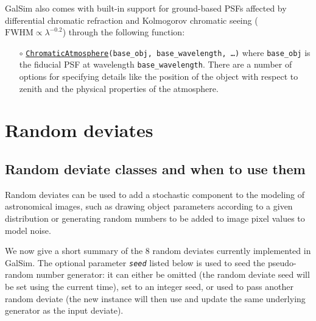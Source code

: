 \documentclass[preprint,10pt]{../../devel/modules/aastex}
\begin{document}
GalSim also comes with built-in support for ground-based PSFs affected by differential chromatic
refraction and Kolmogorov chromatic seeing ($\mathrm{FWHM} \propto \lambda^{-0.2}$) through the
following function:
\begin{itemize}
\item[$\circ$] \texttt{\href{http://galsim-developers.github.io/GalSim/namespacegalsim_1_1chromatic.html\#a90f867f2cde815b9048117e9e426e968}{ChromaticAtmosphere}(base\_obj, base\_wavelength, \dots)}\newline
  where \texttt{base\_obj} is the fiducial PSF at wavelength \texttt{base\_wavelength}.
  There are a number of options for specifying details like the position of the object with
  respect to zenith and the physical properties of the atmosphere.
\end{itemize}

\section{Random deviates}\label{sect:random}
\subsection{Random deviate classes and when to use them}
Random deviates can be used to add a stochastic
component to the modeling of astronomical images, such as drawing
object parameters according to a given distribution or generating random
numbers to be added to image pixel values to model noise.

We now give a short summary of the 8 random deviates currently
implemented in GalSim.   The optional parameter \emph{\texttt{seed}}
listed below is used
to seed the pseudo-random number generator: it can
either be omitted (the random deviate seed will be set using the
current time), set to an integer seed, or used to pass another random
deviate (the new instance will then use and update the same underlying
generator as the input deviate).
\end{document}
